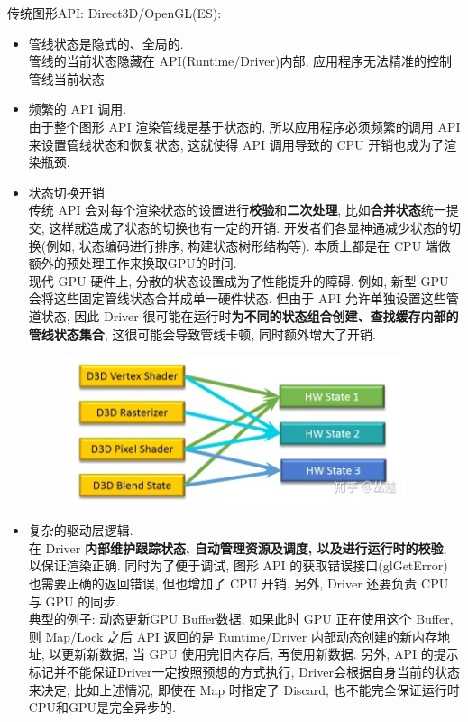 \documentclass[UTF8]{ctexart}
\begin{document}
传统图形API: Direct3D/OpenGL(ES):
\begin{itemize}
\item 管线状态是隐式的、全局的.
  \\管线的当前状态隐藏在 API(Runtime/Driver)内部, 应用程序无法精准的控制管线当前状态
\item 频繁的 API 调用.
  \\由于整个图形 API 渲染管线是基于状态的, 所以应用程序必须频繁的调用 API 来设置管线状态和恢复状态, 这就使得 API 调用导致的 CPU 开销也成为了渲染瓶颈.
\item 状态切换开销
  \\传统 API 会对每个渲染状态的设置进行\textbf{校验}和\textbf{二次处理}, 比如\textbf{合并状态}统一提交, 这样就造成了状态的切换也有一定的开销. 开发者们各显神通减少状态的切换(例如, 状态编码进行排序, 构建状态树形结构等). 本质上都是在 CPU 端做额外的预处理工作来换取GPU的时间.
  \\现代 GPU 硬件上, 分散的状态设置成为了性能提升的障碍. 例如, 新型 GPU 会将这些固定管线状态合并成单一硬件状态. 但由于 API 允许单独设置这些管道状态, 因此 Driver 很可能在运行时\textbf{为不同的状态组合创建、查找缓存内部的管线状态集合}, 这很可能会导致管线卡顿, 同时额外增大了开销.
  \begin{figure}[h]
    \includegraphics[width=10cm]{render_state_merge.jpg}
    \centering
  \end{figure}
\item 复杂的驱动层逻辑.
  \\在 Driver \textbf{内部维护跟踪状态, 自动管理资源及调度, 以及进行运行时的校验}, 以保证渲染正确. 同时为了便于调试, 图形 API 的获取错误接口(glGetError) 也需要正确的返回错误, 但也增加了 CPU 开销. 另外, Driver 还要负责 CPU 与 GPU 的同步.
  \\典型的例子: 动态更新GPU Buffer数据, 如果此时 GPU 正在使用这个 Buffer, 则 Map/Lock 之后 API 返回的是 Runtime/Driver 内部动态创建的新内存地址, 以更新新数据, 当 GPU 使用完旧内存后, 再使用新数据. 另外, API 的提示标记并不能保证Driver一定按照预想的方式执行, Driver会根据自身当前的状态来决定, 比如上述情况, 即使在 Map 时指定了 Discard, 也不能完全保证运行时CPU和GPU是完全异步的.

\end{itemize}
\end{document}
